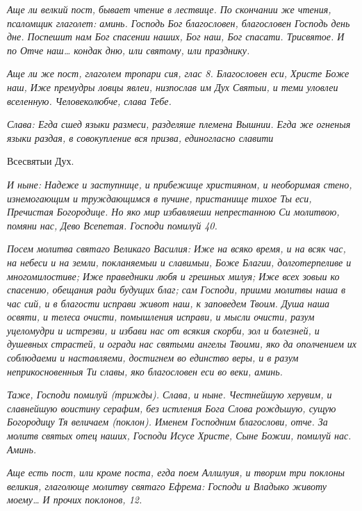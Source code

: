  \itshape Аще ли велкий пост, бывает чтение в лествице. По скончании же чтения,
псаломщик глаголет: аминь.\normalfont{} Господь Бог благословен, благословен
Господь день дне. Поспешит нам Бог спасении наших, Бог наш, Бог
спасати. \itshape Трисвятое\normalfont{}. \itshape И по\normalfont{} Отче наш… \itshape кондак дню, или святому, или
празднику.\normalfont{}


 \itshape Аще ли же пост, глаголем тропари сия, глас 8.\normalfont{} Благословен еси, Христе
Боже наш, Иже премудры ловцы явлеи, низпослав им Дух Святыи, и теми
уловлеи вселенную. Человеколюбче, слава Тебе.


 \itshape Слава:\normalfont{} Егда сшед языки размеси, разделяше племена Вышнии. Егда же
огненыя языки раздая, в совокупление вся призва, единогласно славити

Всесвятыи Дух.


 \itshape И ныне:\normalfont{} Надеже и заступнице, и прибежище християном, и необоримая
стено, изнемогающим и труждающимся в пучине, пристанище тихое Ты еси,
Пречистая Богородице. Но яко мир избавляеши непрестанною Си молитвою,
помяни нас, Дево Всепетая. Господи помилуй \itshape 40\normalfont{}.


 \itshape Посем молитва святаго Великаго Василия:\normalfont{} Иже на всяко время, и на всяк
час, на небеси и на земли, покланяемыи и славимыи, Боже Благии,
долготерпеливе и многомилостиве; Иже праведники любя и грешных милуя;
Иже всех зовыи ко спасению, обещания ради будущих благ; сам Господи,
приими молитвы наша в час сий, и в благости исправи живот наш, к
заповедем Твоим. Душа наша освяти, и телеса очисти, помышления исправи,
и мысли очисти, разум уцеломудри и истрезви, и избави нас от всякия
скорби, зол и болезней, и душевных страстей, и огради нас святыми ангелы
Твоими, яко да ополчением их соблюдаеми и наставляеми, достигнем во
единство веры, и в разум неприкосновенныя Ти славы, яко благословен еси
во веки, аминь.


 \itshape Таже\normalfont{}, Господи помилуй \itshape (трижды)\normalfont{}. \itshape Слава, и ныне\normalfont{}. Честнейшую херувим,
и славнейшую воистину серафим, без истления Бога Слова рождьшую,
сущую Богородицу Тя величаем \itshape (поклон)\normalfont{}. Именем Господним благослови,
отче. За молитв святых отец наших, Господи Исусе Христе, Сыне Божии,
помилуй нас. Аминь.


 \itshape Аще есть пост, или кроме поста, егда поем Аллилуия, и творим три
поклоны великия, глаголюще молитву святаго Ефрема:\normalfont{} Господи и Владыко
животу моему… \itshape И прочих поклонов, 12.\normalfont{}


